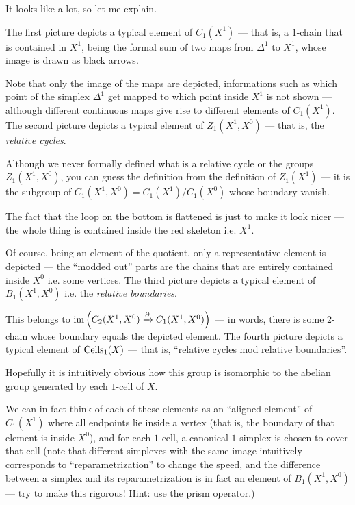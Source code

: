It looks like a lot, so let me explain.
\begin{itemize}
	\ii The first picture depicts a typical element of $C_1(X^1)$ --- that is, a $1$-chain that is
	contained in $X^1$, being the formal sum of two
	maps from $\Delta^1$ to $X^1$, whose image is drawn as black arrows.

	Note that only the image of the maps are depicted, informations such as which point of the
	simplex $\Delta^1$ get mapped to which point inside $X^1$ is not shown --- although different
	continuous maps give rise to different elements of $C_1(X^1)$.
	\ii The second picture depicts a typical element of $Z_1(X^1, X^0)$ --- that is, the
	\emph{relative cycles}.

	Although we never formally defined what is a relative cycle or the groups $Z_1(X^1, X^0)$, you
	can guess the definition from the definition of $Z_1(X^1)$ --- it is the subgroup of
	$C_1(X^1, X^0) = C_1(X^1)/C_1(X^0)$ whose boundary vanish.

	The fact that the loop on the bottom is flattened is just to make it look nicer --- the whole
	thing is contained inside the red skeleton i.e. $X^1$.

	Of course, being an element of the quotient, only a representative element is depicted ---
	the ``modded out'' parts are the chains that are entirely contained inside $X^0$ i.e. some
	vertices.
	\ii The third picture depicts a typical element of $B_1(X^1, X^0)$ i.e. the \emph{relative
	boundaries}.

	This belongs to $\operatorname{im} \left( C_2(X^1, X^0) \xrightarrow{\partial} C_1(X^1, X^0) \right)$ --- in words,
	there is some $2$-chain whose boundary equals the depicted element.
	\ii The fourth picture depicts a typical element of $\operatorname{Cells}_1(X)$ --- that is, ``relative cycles
	mod relative boundaries''.

	Hopefully it is intuitively obvious how this group is isomorphic to the abelian group generated
	by each $1$-cell of $X$.

	We can in fact think of each of these elements as an ``aligned element'' of $C_1(X^1)$
	where all endpoints lie inside a vertex (that is, the boundary of that element is inside $X^0$),
	and for each $1$-cell, a canonical $1$-simplex is chosen to cover that cell (note that different
	simplexes with the same image intuitively corresponds to ``reparametrization'' to change the
	speed, and the difference between a simplex and its reparametrization is in fact
	an element of $B_1(X^1, X^0)$ --- try to make this rigorous! Hint: use the prism operator.)


\end{itemize}
